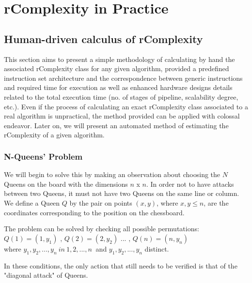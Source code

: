 \chapter{rComplexity in Practice}

\section{Human-driven calculus of rComplexity}
This section aims to present a simple methodology of calculating by hand the associated rComplexity class for any given algorithm, provided a predefined instruction set architecture and the correspondence between generic instructions and required time for execution as well as enhanced hardware designs details related to the total execution time (no. of stages of pipeline, scalability degree, etc.)\cite{hennessy2011computer}. Even if the process of calculating an exact rComplexity class associated to a real algorithm is unpractical, the method provided can be applied with colossal endeavor. Later on, we will present an automated method of estimating the rComplexity of a given algorithm.

\subsection{N-Queens’ Problem}
We will begin to solve this by making an observation about choosing the $N$ Queens on the board with the dimensions $n$ x $n$. In order not to have attacks between two Queens, it must not have two Queens on the same line or column. We define a Queen $Q$ by the pair on points $ (x, y) $, where $ x, y \leq n $, are the coordinates corresponding to the position on the chessboard.

The problem can be solved by checking all possible permutations: $ Q (1) = (1, y_1) $ , 
$ Q (2) = (2, y_2) $ ... , $ Q (n) = (n, y_n) $ \\
where $ y_1, y_2, ..., y_n \ in \ { 1,2, ..., n \ } $ and $ y_1, y_2, ..., y_n $ distinct. 

In these conditions, the only action that still needs to be verified is that of the "diagonal attack" of Queens.

